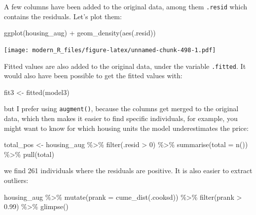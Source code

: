 \documentclass[
]{article}
\newenvironment{Shaded}{\begin{snugshade}}{\end{snugshade}}
\newcommand{\AttributeTok}[1]{\textcolor[rgb]{0.77,0.63,0.00}{#1}}
\newcommand{\DecValTok}[1]{\textcolor[rgb]{0.00,0.00,0.81}{#1}}
\newcommand{\FloatTok}[1]{\textcolor[rgb]{0.00,0.00,0.81}{#1}}
\newcommand{\FunctionTok}[1]{\textcolor[rgb]{0.00,0.00,0.00}{#1}}
\newcommand{\NormalTok}[1]{#1}
\newcommand{\OtherTok}[1]{\textcolor[rgb]{0.56,0.35,0.01}{#1}}
\newcommand{\SpecialCharTok}[1]{\textcolor[rgb]{0.00,0.00,0.00}{#1}}
\begin{document}
A few columns have been added to the original data, among them \texttt{.resid} which contains the
residuals. Let's plot them:

\begin{Shaded}
\begin{Highlighting}[]
\FunctionTok{ggplot}\NormalTok{(housing\_aug) }\SpecialCharTok{+}
  \FunctionTok{geom\_density}\NormalTok{(}\FunctionTok{aes}\NormalTok{(.resid))}
\end{Highlighting}
\end{Shaded}

\texttt{[image: modern\_R\_files/figure-latex/unnamed-chunk-498-1.pdf]}

Fitted values are also added to the original data, under the variable \texttt{.fitted}. It would also have
been possible to get the fitted values with:

\begin{Shaded}
\begin{Highlighting}[]
\NormalTok{fit3 }\OtherTok{\textless{}{-}} \FunctionTok{fitted}\NormalTok{(model3)}
\end{Highlighting}
\end{Shaded}

but I prefer using \texttt{augment()}, because the columns get merged to the original data, which then
makes it easier to find specific individuals, for example, you might want to know for which housing
units the model underestimates the price:

\begin{Shaded}
\begin{Highlighting}[]
\NormalTok{total\_pos }\OtherTok{\textless{}{-}}\NormalTok{ housing\_aug }\SpecialCharTok{\%\textgreater{}\%}
  \FunctionTok{filter}\NormalTok{(.resid }\SpecialCharTok{\textgreater{}} \DecValTok{0}\NormalTok{) }\SpecialCharTok{\%\textgreater{}\%}
  \FunctionTok{summarise}\NormalTok{(}\AttributeTok{total =} \FunctionTok{n}\NormalTok{()) }\SpecialCharTok{\%\textgreater{}\%}
  \FunctionTok{pull}\NormalTok{(total)}
\end{Highlighting}
\end{Shaded}

we find 261 individuals where the residuals are positive. It is also easier to
extract outliers:

\begin{Shaded}
\begin{Highlighting}[]
\NormalTok{housing\_aug }\SpecialCharTok{\%\textgreater{}\%}
  \FunctionTok{mutate}\NormalTok{(}\AttributeTok{prank =} \FunctionTok{cume\_dist}\NormalTok{(.cooksd)) }\SpecialCharTok{\%\textgreater{}\%}
  \FunctionTok{filter}\NormalTok{(prank }\SpecialCharTok{\textgreater{}} \FloatTok{0.99}\NormalTok{) }\SpecialCharTok{\%\textgreater{}\%}
  \FunctionTok{glimpse}\NormalTok{()}
\end{Highlighting}
\end{Shaded}
\end{document}
